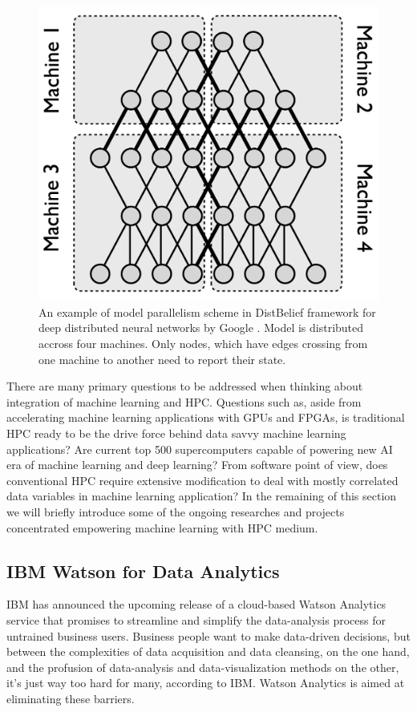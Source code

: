 \documentclass[runningheads,a4paper]{llncs}
\begin{document}
\begin{figure}[h]
	\includegraphics[scale=0.3]{./images/model_parallelism.png}
	\centering
	\caption{An example of model parallelism scheme in DistBelief framework for deep distributed neural networks by Google \cite{dean2012large}. Model is distributed accross four machines. Only nodes, which have edges crossing from one machine to another need to report their state.}
	\label{fig:model_parallelism}
\end{figure}

There are many primary questions to be addressed when thinking about integration of machine learning and HPC. Questions such as, aside from accelerating machine learning applications with GPUs and FPGAs, is traditional HPC ready to be the drive force behind data savvy machine learning applications? Are current top 500 supercomputers capable of powering new AI era of machine learning and deep learning? From software point of view, does conventional HPC require extensive modification to deal with mostly correlated data variables in machine learning application?
In the remaining of this section we will briefly introduce some of the ongoing researches and projects concentrated empowering machine learning with HPC medium.
\newpage
\subsection*{IBM Watson for Data Analytics} %
IBM has announced the upcoming release of a cloud-based Watson Analytics service that promises to streamline and simplify the data-analysis process for untrained business users. Business people want to make data-driven decisions, but between the complexities of data acquisition and data cleansing, on the one hand, and the profusion of data-analysis and data-visualization methods on the other, it's just way too hard for many, according to IBM. Watson Analytics is aimed at eliminating these barriers.\\
\end{document}
